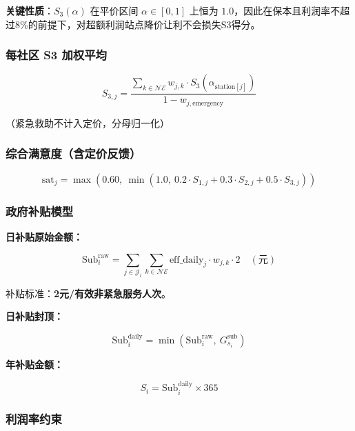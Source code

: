 \documentclass[UTF8]{ctexart}
\begin{document}
\textbf{关键性质}：$S_3(\alpha)$ 在平价区间 $\alpha\in[0,1]$ 上恒为 $1.0$，因此在保本且利润率不超过8\%的前提下，对超额利润站点降价让利不会损失S3得分。

\subsubsection{每社区 S3 加权平均}

\begin{equation}
S_{3,j} = \frac{\sum_{k\in\mathcal{NE}} w_{j,k} \cdot S_3(\alpha_{\text{station}[j]})}{1 - w_{j,\text{emergency}}} \tag{3.2}
\end{equation}

（紧急救助不计入定价，分母归一化）

\subsubsection{综合满意度（含定价反馈）}

\begin{equation}
\text{sat}_j = \max\left(0.60,\ \min\left(1.0,\ 0.2\cdot S_{1,j} + 0.3\cdot S_{2,j} + 0.5\cdot S_{3,j}\right)\right) \tag{3.3}
\end{equation}

\subsubsection{政府补贴模型}

\textbf{日补贴原始金额：}

\begin{equation}
\text{Sub}_i^{\text{raw}} = \sum_{j\in\mathcal{J}_i}\sum_{k\in\mathcal{NE}} \text{eff\_daily}_j \cdot w_{j,k} \cdot 2 \quad (\text{元}) \tag{3.4}
\end{equation}

补贴标准：\textbf{2元/有效非紧急服务人次}。

\textbf{日补贴封顶：}

\begin{equation}
\text{Sub}_i^{\text{daily}} = \min\left(\text{Sub}_i^{\text{raw}},\ G_{s_i}^{\text{sub}}\right) \tag{3.5}
\end{equation}

\textbf{年补贴金额：}

\begin{equation}
S_i = \text{Sub}_i^{\text{daily}} \times 365 \tag{3.6}
\end{equation}

\subsubsection{利润率约束}
\end{document}
